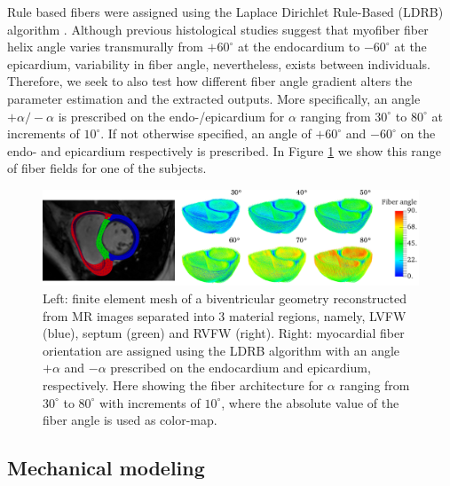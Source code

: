 Rule based fibers were assigned using the Laplace Dirichlet
Rule-Based (LDRB) algorithm \citep{bayer2012novel}.
Although previous histological studies \citep{streeter1969fiber}
suggest that myofiber fiber helix angle varies transmurally from
$+60^{\circ}$ at the endocardium to $-60^{\circ}$ at the epicardium,
variability in fiber angle,  nevertheless, exists between individuals.
Therefore, we seek to also test how different fiber angle gradient
alters the parameter estimation and the extracted outputs.
More specifically, an angle $+\alpha/-\alpha$ is prescribed on the
endo-/epicardium for $\alpha$ ranging from $30^{\circ}$ to $80^{\circ}$ at
increments of  $10^{\circ}$. If not otherwise specified, an angle of $+60^{\circ}$ and
$-60^{\circ}$ on the endo- and epicardium respectively is prescribed. In
Figure \ref{paper3:fig:fiber_angles} we show this range of fiber fields for
one of the subjects.


\begin{figure}[htbp]
    \includegraphics[width=\textwidth]{figures/fiber/fiber_v2}
\caption{\label{paper3:fig:fiber_angles} Left: finite
    element mesh of a biventricular geometry reconstructed from MR
    images separated into 3 material regions, namely, LVFW (blue),
    septum (green) and RVFW (right). Right: myocardial fiber
  orientation are assigned using the LDRB algorithm
  \citep{bayer2012novel} with an angle $+\alpha$ and 
  $-\alpha$ prescribed on the endocardium and epicardium, respectively. Here
  showing the fiber architecture for $\alpha$ ranging from
  $30^{\circ}$ to $80^{\circ}$ with increments of $10^{\circ}$, where
  the absolute value of the fiber angle is used as
  color-map.} 
\end{figure}





\subsection{Mechanical modeling}
\label{paper3:sec:mechanical_model}

